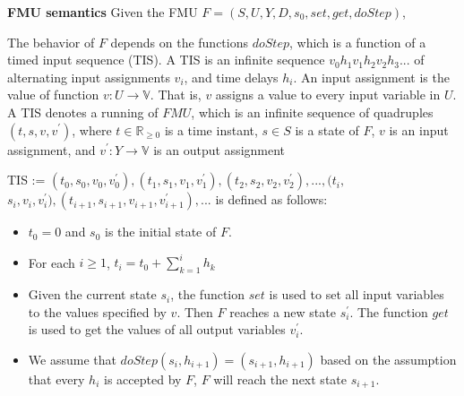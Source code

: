 \begin{definition}
\textbf{FMU semantics}
Given the FMU $F=(S,U,Y,D,s_{0},set,get,doStep)$,
\end{definition} 
The behavior of $F$ depends on the functions $doStep$, which is a function of a timed input sequence (TIS). A TIS is an infinite sequence 
$v_{0}h_{1}v_{1}h_{2}v_{2}h_{3}...$
of alternating input assignments $v_{i}$, and time delays $h_{i}$. An input assignment is the value of function $v : U \rightarrow \mathbb{V}$. That is, $v$ assigns a value to every input variable in $U$.
A TIS denotes a running of $FMU$, which is an infinite sequence of quadruples $(t,s,v,v^{\prime})$, where $t \in \mathbb{R}_{\geqslant{0}}$ is a time instant, $s \in S$ is a state of $F$, $v$ is an input assignment, and $v^{\prime} : Y \rightarrow \mathbb{V}$ is an output assignment
 
TIS := $(t_{0},s_{0},v_{0},v_{0}^{\prime}), (t_{1},s_{1},v_{1},v_{1}^{\prime}),(t_{2},s_{2},v_{2},v_{2}^{\prime}), ..., (t_{i},$
$s_{i},v_{i},v_{i}^{\prime}), (t_{i+1},s_{i+1},v_{i+1},v_{i+1}^{\prime}), ...$ is
defined as follows:
\begin{itemize}
\item
$t_{0} = 0$ and $s_{0}$ is the initial state of $F$.
\item
For each $i \geqslant 1$, $t_{i} = t_{0} + \sum_{k = 1}^i h_{k}$
\item
Given the current state $s_{i}$, the function $set$ is used to set all input variables to the values specified by $v$. Then $F$ reaches a new state $s_{i}^{\prime}$. The function $get$ is used to get the values of all output variables $v_{i}^{\prime}$.
\item 
We assume that $doStep(s_{i}, h_{i+1}) = (s_{i+1},h_{i+1})$ based on the assumption that every $h_{i}$ is accepted by $F$, $F$ will reach the next state $s_{i+1}$.
\end{itemize}

